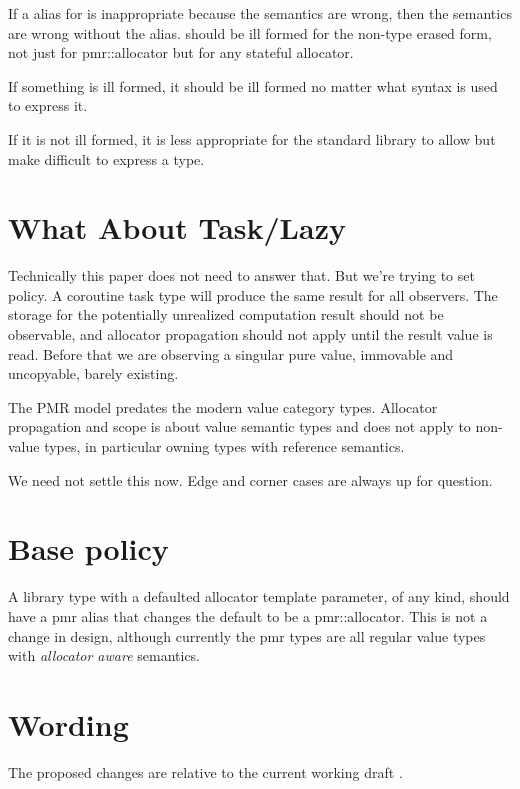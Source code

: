 \documentclass[a4paper,10pt,oneside,openany,final,article]{memoir}
\begin{document}
If a  alias for  is inappropriate because the semantics are wrong, then the semantics are wrong without the alias.  should be ill formed for the non-type erased form, not just for pmr::allocator but for any stateful allocator.

If something is ill formed, it should be ill formed no matter what syntax is used to express it.

If it is not ill formed, it is less appropriate for the standard library to allow but make difficult to express a type.

\chapter{What About Task/Lazy}

Technically this paper does not need to answer that. But we're trying to set policy. A coroutine task type will produce the same result for all observers. The storage for the potentially unrealized computation result should not be observable, and allocator propagation should not apply until the result value is read. Before that we are observing a singular pure value, immovable and uncopyable, barely existing.

The PMR model predates the modern value category types. Allocator propagation and scope is about value semantic types and does not apply to non-value types, in particular owning types with reference semantics.

We need not settle this now. Edge and corner cases are always up for question.


\chapter{Base  policy}

A library type with a defaulted allocator template parameter, of any kind, should have a pmr alias that changes the default to be a pmr::allocator. This is not a change in design, although currently the pmr types are all regular value types with \textit{allocator aware} semantics.

\chapter{Wording}

The proposed changes are relative to the current working draft \cite{N4917}.
\end{document}
